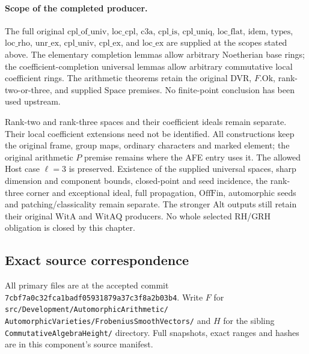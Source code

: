 \paragraph{Scope of the completed producer.}
The full original \(\mathrm{cpl\_of\_univ}\),
\(\mathrm{loc\_cpl}\), \(\mathrm{c3a}\),
\(\mathrm{cpl\_is}\), \(\mathrm{cpl\_uniq}\),
\(\mathrm{loc\_flat}\), \(\mathrm{idem}\),
\(\mathrm{types}\), \(\mathrm{loc\_rho}\),
\(\mathrm{unr\_ex}\), \(\mathrm{cpl\_univ}\),
\(\mathrm{cpl\_ex}\), and \(\mathrm{loc\_ex}\)
are supplied at the scopes stated above.  The elementary
completion lemmas allow arbitrary Noetherian base rings;
the coefficient-completion universal lemmas allow arbitrary
commutative local coefficient rings.  The arithmetic
theorems retain the original DVR, \(F.\mathrm{Ok}\),
rank-two-or-three, and supplied \(\mathrm{Space}\) premises.
No finite-point conclusion has been used upstream.

Rank-two and rank-three spaces and their coefficient ideals
remain separate.  Their local coefficient extensions need
not be identified.  All constructions keep the original
frame, group maps, ordinary characters and marked element;
the original arithmetic \(P\) premise remains where the
AFE entry uses it.  The allowed Host case \(\ell=3\) is
preserved.  Existence of the supplied universal spaces,
sharp dimension and component bounds, closed-point and
seed incidence, the rank-three corner and exceptional
ideal, full propagation, \(\mathrm{OffFin}\), automorphic
seeds and patching/classicality remain separate.  The
stronger Alt outputs still retain their original
\(\mathrm{WitA}\) and \(\mathrm{WitAQ}\) producers.
No whole selected RH/GRH obligation is closed by this chapter.

\subsection{Exact source correspondence}

All primary files are at the accepted commit
\texttt{7cbf7a0c32fca1badf05931879a37c3f8a2b03b4}.
Write \(F\) for
\texttt{src/\allowbreak{}Development/\allowbreak{}Automorphic\allowbreak{}Arithmetic/\allowbreak{}}
\texttt{Automorphic\allowbreak{}Varieties/\allowbreak{}Frobenius\allowbreak{}Smooth\allowbreak{}Vectors/\allowbreak{}}
and \(H\) for the sibling
\texttt{Commutative\allowbreak{}Algebra\allowbreak{}Height/\allowbreak{}} directory.
Full snapshots, exact ranges and hashes are in this component's
source manifest.

